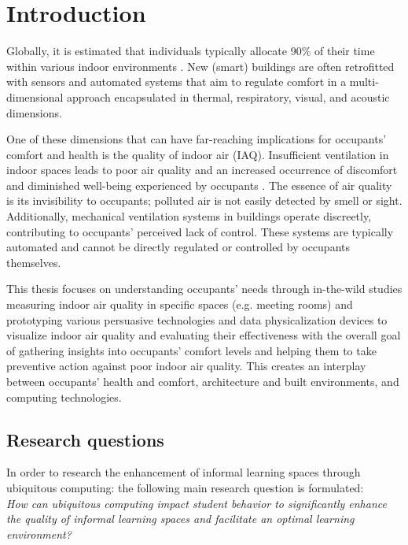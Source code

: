 \section{Introduction}
Globally, it is estimated that individuals typically allocate 90\% of their time within various indoor environments \cite{indoor}. New (smart) buildings are often retrofitted with sensors and automated systems that aim to regulate comfort in a multi-dimensional approach encapsulated in thermal, respiratory, visual, and acoustic dimensions. 

One of these dimensions that can have far-reaching implications for occupants' comfort and health is the quality of indoor air (IAQ). Insufficient ventilation in indoor spaces leads to poor air quality and an increased occurrence of discomfort and diminished well-being experienced by occupants \cite{ventilation}. The essence of air quality is its invisibility to occupants; polluted air is not easily detected by smell or sight. Additionally, mechanical ventilation systems in buildings operate discreetly, contributing to occupants' perceived lack of control. These systems are typically automated and cannot be directly regulated or controlled by occupants themselves.

This thesis focuses on understanding occupants' needs through in-the-wild studies measuring indoor air quality in specific spaces (e.g. meeting rooms) and prototyping various persuasive technologies and data physicalization devices to visualize indoor air quality and evaluating their effectiveness with the overall goal of gathering insights into occupants' comfort levels and helping them to take preventive action against poor indoor air quality. This creates an interplay between occupants' health and comfort, architecture and built environments, and computing technologies.





\subsection{Research questions}

In order to research the enhancement of informal learning spaces through ubiquitous computing:  the following main research question is formulated: \\

\emph{How can ubiquitous computing impact student behavior to significantly enhance the quality of informal learning spaces and facilitate an optimal learning environment?} \\

